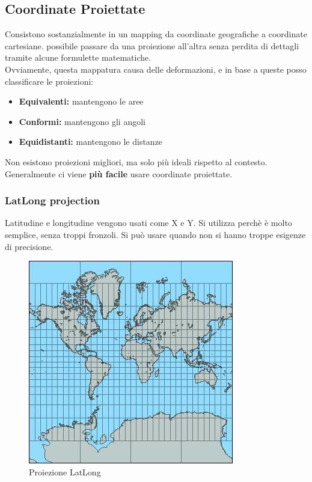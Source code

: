 \documentclass[a4paper,12pt]{article}
\begin{document}
\subsection{Coordinate Proiettate}
Consistono sostanzialmente in un mapping da coordinate geografiche a coordinate cartesiane. \E possibile passare da una proiezione all'altra senza perdita di dettagli tramite alcune formulette matematiche.\\
Ovviamente, questa mappatura causa delle deformazioni, e in base a queste posso classificare le proiezioni:
\begin{itemize}
\item \textbf{Equivalenti:} mantengono le aree
\item \textbf{Conformi:} mantengono gli angoli
\item \textbf{Equidistanti: } mantengono le distanze
\end{itemize}
Non esistono proiezioni migliori, ma solo più ideali rispetto al contesto.
Generalmente ci viene \textbf{più facile} usare coordinate proiettate.


\subsubsection{LatLong projection}
Latitudine e longitudine vengono usati come X e Y. Si utilizza perchè è molto semplice, senza troppi fronzoli. Si può usare quando non si hanno troppe esigenze di precisione.\\

\begin{figure}[H]
	\centering
	\includegraphics[width=.6\linewidth]{Immagini/LatLongProj}
	\caption{Proiezione LatLong}
\end{figure}
\end{document}

